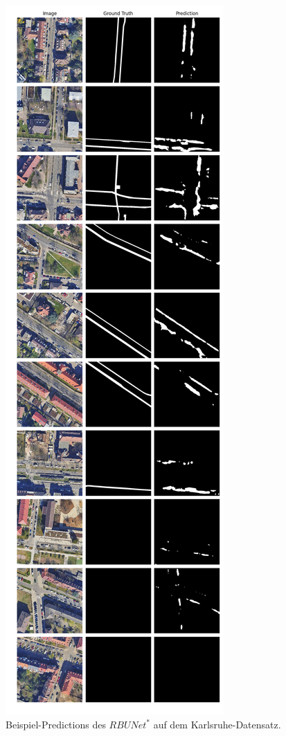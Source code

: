 \begin{figure}
	\centering
	\includegraphics[width=.41\textwidth]{Bilder/Samples-KA/rbunet-s.png} 
	\caption{Beispiel-Predictions des $RBUNet^*$ auf dem Karlsruhe-Datensatz.}
	\label{fig:ka-samples-rbunet-s}
\end{figure}

